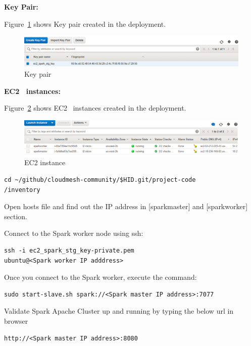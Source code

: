 \textbf{Key Pair:}

Figure~\ref{f:key-pair} shows Key pair created in the deployment.

\begin{figure}[!ht]
	\centering\includegraphics[width=\columnwidth]{images/keypair.png}
	\caption{Key pair}\label{f:key-pair}
\end{figure}

\textbf{EC2~\cite{hid-sp18-511-www-ec2} instances:}

Figure~\ref{f:ec2-instance} shows EC2~\cite{hid-sp18-511-www-ec2}
instances created in the deployment.

\begin{figure}[!ht]
	\centering\includegraphics[width=\columnwidth]{images/ec2instances.png}
	\caption{EC2 instance}\label{f:ec2-instance}
\end{figure}


\begin{verbatim}
cd ~/github/cloudmesh-community/$HID.git/project-code
/inventory
\end{verbatim}

Open hosts file and find out the IP address in [sparkmaster] and
[sparkworker] section.

Connect to the Spark worker node using ssh:

\begin{verbatim}
ssh -i ec2_spark_stg_key-private.pem 
ubuntu@<Spark worker IP adddress>
\end{verbatim}

Once you connect to the Spark worker, execute the command:

\begin{verbatim}
sudo start-slave.sh spark://<Spark master IP address>:7077
\end{verbatim}

Validate Spark Apache Cluster up and running by typing the below url
in browser

\begin{verbatim}
http://<Spark master IP address>:8080
\end{verbatim}


